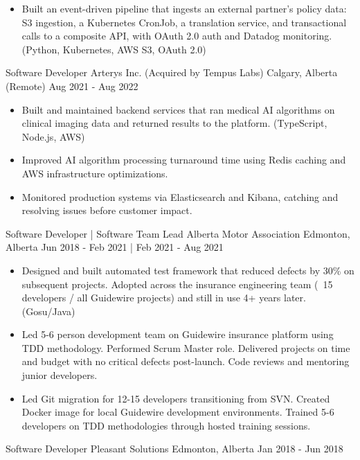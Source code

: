 \begin{cventries}
{\begin{itemize}
                \item Built an event-driven pipeline that ingests an external partner's policy data: S3 ingestion, a Kubernetes CronJob, a translation service, and transactional calls to a composite API, with OAuth 2.0 auth and Datadog monitoring. (Python, Kubernetes, AWS S3, OAuth 2.0)
            \end{itemize}
        }
    \cventry
        {Software Developer}
        {Arterys Inc. (Acquired by Tempus Labs)}
        {Calgary, Alberta (Remote)}
        {Aug 2021 - Aug 2022}
        {
            \begin{itemize}
                \item Built and maintained backend services that ran medical AI algorithms on clinical imaging data and returned results to the platform. (TypeScript, Node.js, AWS)
                \item Improved AI algorithm processing turnaround time using Redis caching and AWS infrastructure optimizations.
                \item Monitored production systems via Elasticsearch and Kibana, catching and resolving issues before customer impact.
            \end{itemize}
        }
    \cventry
        {Software Developer | Software Team Lead}
        {Alberta Motor Association}
        {Edmonton, Alberta}
        {Jun 2018 - Feb 2021 | Feb 2021 - Aug 2021}
        {
            \begin{itemize}
                \item Designed and built automated test framework that reduced defects by 30\% on subsequent projects. Adopted across the insurance engineering team (~15 developers / all Guidewire projects) and still in use 4+ years later. (Gosu/Java)
                \item Led 5-6 person development team on Guidewire insurance platform using TDD methodology. Performed Scrum Master role. Delivered projects on time and budget with no critical defects post-launch. Code reviews and mentoring junior developers.
                \item Led Git migration for 12-15 developers transitioning from SVN. Created Docker image for local Guidewire development environments. Trained 5-6 developers on TDD methodologies through hosted training sessions.
            \end{itemize}
        }
    \cventry
        {Software Developer}
        {Pleasant Solutions}
        {Edmonton, Alberta}
        {Jan 2018 - Jun 2018}

\end{cventries}
